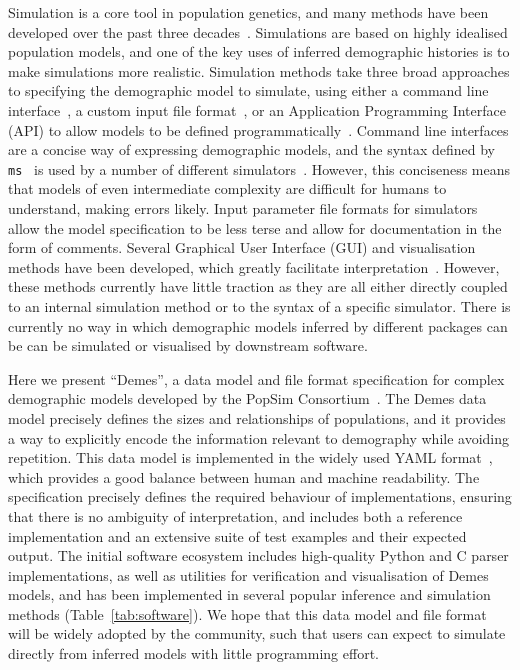 \documentclass[11pt]{article}
\newcommand{\ms}[0]{\texttt{ms}}
\begin{document}
Simulation is a core tool in population genetics, and
many methods have been developed over the past three
decades~\citep{carvajal2008simulation,liu2008survey,
arenas2012simulation,yuan2012overview,hoban2012computer}.
Simulations are based on highly idealised population models,
and one of the key uses of inferred demographic histories
is to make simulations more realistic.
Simulation methods take three broad approaches to specifying
the demographic model to simulate,
using either a command line
interface~\citep[e.g.,][]{hudson2002generating,hernandez_flexible_2008,kern2016discoal},
a custom input file
format~\citep[e.g.,][]{guillaume2006nemo,excoffier2011fastsimcoal,shlyakhter2014cosi2},
or an Application Programming Interface (API) to allow
models to be defined programmatically~\citep[e.g.,][]{
thornton2014cpp,hernandez_sfs_code_2015,kelleher2016efficient,
becheler2019quetzal,haller2019slim,thornton2019-nu,baumdicker2021-iu}.
Command line interfaces are a concise way of expressing
demographic models, and the syntax defined by \ms~\citep{hudson2002generating}
is used by a number of different
simulators~\citep[e.g.,][]{ewing2010msms,chen2009fast,staab2015scrm}.
However, this conciseness means that models of even intermediate complexity
are difficult for humans to understand, making errors likely.
Input parameter file formats for simulators allow the model specification
to be less terse and allow for documentation in the form of comments.
Several Graphical User Interface (GUI) and visualisation
methods have been developed, which greatly facilitate
interpretation~\citep{mailund2005coasim,antao2007modeler4simcoal2,
parreira_spams_2009,ewing2010msms,parobek_skelesim_2017,zhou2018popdemog}.
However, these methods
currently have little traction as they are all either directly coupled
to an internal simulation method or to the  syntax of a specific simulator.
There is currently no way in which demographic models inferred by
different packages can be can be simulated or visualised by downstream software.

Here we present ``Demes'', a data model and file format specification for
complex demographic models developed by the
PopSim Consortium~\citep{adrion2020community}.
The Demes data model precisely defines the sizes and relationships
of populations, and it provides a way to explicitly encode the
information relevant to demography while avoiding repetition.
This data model is implemented in the widely used YAML
format~\citep{ben2009yaml}, which provides a good balance between human
and machine readability.
The specification precisely defines the required behaviour of implementations,
ensuring that there is no ambiguity of interpretation, and includes both a
reference implementation and an extensive suite of test examples and their
expected output.
The initial software ecosystem includes high-quality Python
and C parser implementations, as well as utilities for verification and
visualisation of Demes models, and has been implemented in several popular
inference and simulation methods (Table~\ref{tab:software}).
We hope that this data model and file format will be widely adopted
by the community, such that users can expect to simulate directly
from inferred models with little programming effort.
\end{document}
